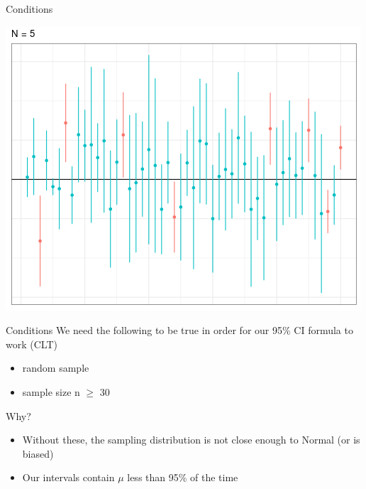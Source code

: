 \documentclass{beamer}
\begin{document}
\begin{frame}{Conditions}
\begin{center}
\includegraphics[scale=0.5]{n5.png}
\end{center}
\end{frame}

\begin{frame}{Conditions}
We need the following to be true in order for our 95\% CI formula to work (CLT)
\begin{itemize}
    \item random sample
    \item sample size n $\geq$ 30
\end{itemize} \vspace{10mm}

Why?
\begin{itemize}
    \item Without these, the sampling distribution is not close enough to Normal (or is biased)
    \item Our intervals contain $\mu$ less than 95\% of the time
\end{itemize}
\end{frame}
\end{document}
